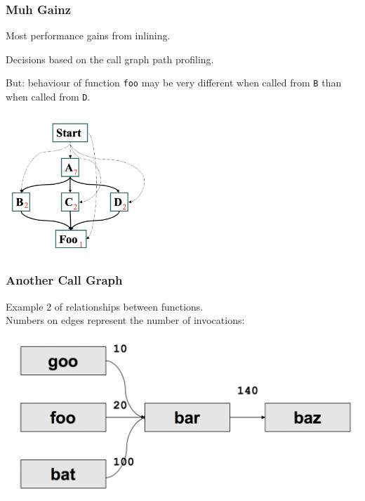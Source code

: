 \begin{frame}
\frametitle{Muh Gainz}


\begin{changemargin}{2cm}
Most performance gains from inlining.

Decisions based on the call graph path profiling. 

But: behaviour of function \texttt{foo} may be very different when called from \texttt{B} than when called from \texttt{D}. 


\begin{center}
	\includegraphics[width=0.4\textwidth]{images/callpaths.png}
\end{center}
\end{changemargin}
\end{frame}



\begin{frame}
\frametitle{Another Call Graph}


Example 2 of relationships between functions.\\
Numbers on edges represent the number of invocations:

\begin{center}
	\includegraphics[width=\textwidth]{images/callpaths2.png}
\end{center}

\end{frame}



